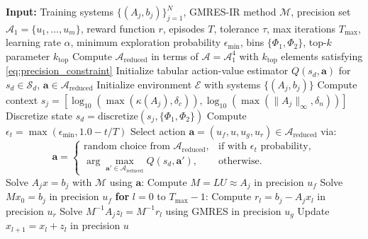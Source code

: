 \documentclass[Afour,sageh,times]{sagej}
\theoremstyle{plain}
\theoremstyle{definition}
\begin{document}
\begin{algorithm}
\caption{Contextual Bandit Learning for GMRES-IR Precision Selection}
\label{alg:gmres_precision}
\begin{algorithmic}[1]
\State \textbf{Input:} Training systems $\{ (A_j, b_j) \}_{j=1}^N$, GMRES-IR method $\mathcal{M}$, precision set $\mathcal{A}_1 = \{ u_1, \ldots, u_m \}$, reward function $r$, episodes $T$, tolerance $\tau$, max iterations $T_{\text{max}}$, learning rate $\alpha$, minimum exploration probability $\epsilon_{\text{min}}$, bins $\{ \Phi_1, \Phi_2 \}$, top-$k$ parameter $k_{\text{top}}$
\State Compute $\mathcal{A}_{\text{reduced}}$ in terms of $\mathcal{A} = \mathcal{A}_1^4$ with $k_{\text{top}}$ elements satisfying \eqref{eq:precision_constraint}
\State Initialize tabular action-value estimator $Q(s_d, \mathbf{a})$ for $s_d \in \mathcal{S}_d$, $\mathbf{a} \in \mathcal{A}_{\text{reduced}}$
\State Initialize environment $\mathcal{E}$ with systems $\{ (A_j, b_j) \}$
        \State Compute context $s_j = [\log_{10}(\max(\kappa(A_j), \delta_c)), \log_{10}(\max(\|A_j\|_\infty, \delta_n))]$
        \State Discretize state $s_d = \text{discretize}(s_j, \{ \Phi_1, \Phi_2 \})$
        \State Compute $\epsilon_t = \max(\epsilon_{\text{min}}, 1.0 - t / T)$
        \State Select action $\mathbf{a} = (u_f, u, u_g, u_r) \in \mathcal{A}_{\text{reduced}}$ via:
        \begin{equation*}
        \mathbf{a} =
        \begin{cases}
        \text{random choice from } \mathcal{A}_{\text{reduced}}, & \text{if } \text{with } \epsilon_t \text{ probability}, \\
        \arg\max_{\mathbf{a}' \in \mathcal{A}_{\text{reduced}}} Q(s_d, \mathbf{a}'), & \text{otherwise}.
        \end{cases}
        \end{equation*}
        \State Solve $A_j x = b_j$ with $\mathcal{M}$ using $\mathbf{a}$:
        \State \quad Compute $M = LU \approx A_j$ in precision $u_f$
        \State \quad Solve $M x_0 = b_j$ in precision $u_f$
        \State \quad \textbf{for} $l = 0$ to $T_{\text{max}} - 1$:
        \State \quad \quad Compute $r_l = b_j - A_j x_l$ in precision $u_r$
        \State \quad \quad Solve $M^{-1} A_j z_l = M^{-1} r_l$ using GMRES in precision $u_g$
        \State \quad \quad Update $x_{l+1} = x_l + z_l$ in precision $u$

\end{algorithmic}
\end{algorithm}
\end{document}
